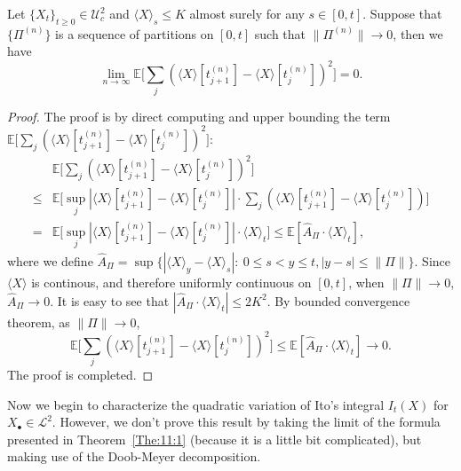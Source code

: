 \begin{proposition}
Let $\{X_t\}_{t\ge0}\in\mathcal{U}_c^2$ and $\langle X\rangle_s\le K$ almost surely for any $s\in[0,t]$.
Suppose that $\{\Pi^{(n)}\}$ is a sequence of partitions on $[0,t]$ such that $\|\Pi^{(n)}\|\to0$, then we have
\[
\lim_{n\to\infty}\mathbb{E}\bigg[
\sum_j\left(
\langle X\rangle[t_{j+1}^{(n)}] - \langle X\rangle[t_{j}^{(n)}]
\right)^2
\bigg]=0.
\]
\end{proposition}
\begin{proof}
The proof is by direct computing and upper bounding the term $\mathbb{E}\bigg[
\sum_j\left(
\langle X\rangle[t_{j+1}^{(n)}] - \langle X\rangle[t_{j}^{(n)}]
\right)^2
\bigg]$:
\begin{align*}
&\mathbb{E}\bigg[
\sum_j\left(
\langle X\rangle[t_{j+1}^{(n)}] - \langle X\rangle[t_{j}^{(n)}]
\right)^2
\bigg]\\
\le &
\mathbb{E}\bigg[
\sup_j\left|\langle X\rangle[t_{j+1}^{(n)}] - \langle X\rangle[t_{j}^{(n)}]\right|\cdot
\sum_j\left(
\langle X\rangle[t_{j+1}^{(n)}] - \langle X\rangle[t_{j}^{(n)}]
\right)
\bigg]\\
=&
\mathbb{E}\bigg[
\sup_j\left|\langle X\rangle[t_{j+1}^{(n)}] - \langle X\rangle[t_{j}^{(n)}]\right|\cdot
\langle X\rangle_t
\bigg]\le \mathbb{E}[\hat{A}_{\Pi}\cdot \langle X\rangle_t],
\end{align*}
where we define $\hat{A}_{\Pi}=\sup\{|\langle X\rangle_y-\langle X\rangle_s|:~0\le s<y\le t, |y-s|\le\|\Pi\|\}$.
Since $\langle X\rangle$ is continous, and therefore uniformly continuous on $[0,t]$, 
when $\|\Pi\|\to0$, $\hat{A}_{\Pi}\to0$.
It is easy to see that $|\hat{A}_{\Pi}\cdot \langle X\rangle_t|\le 2K^2$.
By bounded convergence theorem, as $\|\Pi\|\to0$,
\[
\mathbb{E}\bigg[
\sum_j\left(
\langle X\rangle[t_{j+1}^{(n)}] - \langle X\rangle[t_{j}^{(n)}]
\right)^2
\bigg]\le \mathbb{E}[\hat{A}_{\Pi}\cdot \langle X\rangle_t]\to0.
\]
The proof is completed.
\end{proof}

Now we begin to characterize the quadratic variation of Ito's integral $I_t(X)$ for $X_{\bullet}\in\mathcal{L}^2$. However, we don't prove this result by taking the limit of the formula presented in Theorem~\ref{The:11:1} (because it is a little bit complicated), but making use of the Doob-Meyer decomposition.







